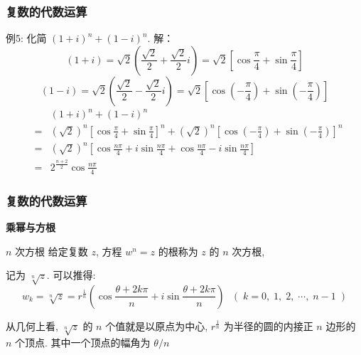 \documentclass{beamer}
\begin{document}
\begin{frame}[t]
\frametitle{复数的代数运算}

\begin{exampleblock}{例5: 化简 $ (1+i)^n + (1-i)^n$.}
解：
$$(1+i) = \sqrt{2}\left( \frac{\sqrt{2}}{2} + \frac{\sqrt{2}}{2} i \right) =  \sqrt{2} \left[ \cos{\frac{\pi}{4}}+ \sin{\frac{\pi}{4}} \right]$$
$$(1-i) = \sqrt{2}\left( \frac{\sqrt{2}}{2} - \frac{\sqrt{2}}{2} i \right) =  \sqrt{2} \left[ \cos{\left(-\frac{\pi}{4} \right)}+ \sin{\left(-\frac{\pi}{4} \right)} \right]$$
\begin{eqnarray*} 
 & & (1  + i)^n + (1-i)^n  \\
 &=& (\sqrt{2})^n \left[ \cos{\frac{\pi}{4}}+ \sin{\frac{\pi}{4}}\right]^n+(\sqrt{2})^n \left[ \cos{\left( -\frac{\pi}{4}  \right)} + \sin{\left(-\frac{\pi}{4} \right)} \right]^n \\
 &=& (\sqrt{2})^n \left[\cos{\frac{n\pi}{4}}+i\sin{\frac{n\pi}{4}} +\cos{\frac{n\pi}{4}}-i\sin{\frac{n\pi}{4}}  \right]\\
 &=&  2^{\frac{n+2}{2}}\cos{\frac{n\pi}{4}} 
\end{eqnarray*}
\end{exampleblock}
\end{frame}


\begin{frame}[t]
\frametitle{复数的代数运算}
\textbf{乘幂与方根}\\
\begin{block}{ $ n $ 次方根}
给定复数 $ z $, 方程 $ {w^n} = z $ 的根称为 $ z $ 的 $ n $ 次方根, 

记为 $ \sqrt[n]{z} $. 可以推得: 
\[{w_k} = \sqrt[n]{z} = {r^{\frac{1}{n}}}\left( {\cos \frac{{\theta + 2k\pi}}{n} + i\sin \frac{{\theta + 2k\pi}}{n}} \right)~~~(\; k = 0, \; 1, \; 2, \; \cdots, \; n - 1\; )\]

从几何上看,  $ \sqrt[n]{z} $ 的 $ n $ 个值就是以原点为中心,  $ {r^{\frac{1}{n}}} $ 为半径的圆的内接正 $ n $ 边形的 $ n $ 个顶点. 其中一个顶点的幅角为 $  \theta/n $ 

\end{block}
\end{frame}
\end{document}

